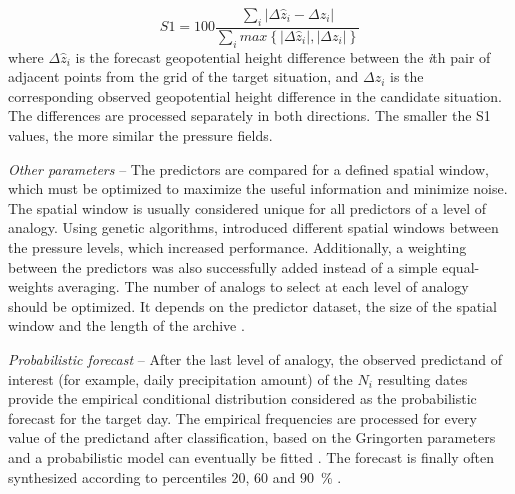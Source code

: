 \documentclass[gmd]{copernicus}
\begin{document}
\begin{equation}
\label{eq:S1}
S1=100 \frac {\displaystyle \sum_{i} \vert \Delta\hat{z}_{i} - \Delta z_{i} \vert}
{\displaystyle \sum_{i} max\left\lbrace \vert \Delta\hat{z}_{i} \vert , \vert \Delta z_{i} \vert \right\rbrace }
\end{equation}
where $\Delta \hat{z}_{i}$ is the forecast geopotential height difference between the \textit{i}th pair of adjacent points from the grid of the target situation, and $\Delta z_{i}$ is the corresponding observed geopotential height difference in the candidate situation. The differences are processed separately in both directions. The smaller the S1 values, the more similar the pressure fields.

\textit{Other parameters} -- The predictors are compared for a defined spatial window, which must be optimized to maximize the useful information and minimize noise. The spatial window is usually considered unique for all predictors of a level of analogy. Using genetic algorithms, \citet{Horton2018a} introduced different spatial windows between the pressure levels, which increased performance. Additionally, a weighting between the predictors was also successfully added instead of a simple equal-weights averaging. The number of analogs to select at each level of analogy should be optimized. It depends on the predictor dataset, the size of the spatial window and the length of the archive \citet{Ruosteenoja1988, Vandendool1994}.

\textit{Probabilistic forecast} -- After the last level of analogy, the observed predictand of interest (for example, daily precipitation amount) of the $N_{i}$ resulting dates provide the empirical conditional distribution considered as the probabilistic forecast for the target day. The empirical frequencies are processed for every value of the predictand after classification, based on the Gringorten parameters \cite[for a Gumbel or exponential law; see][]{Gringorten1963} and a probabilistic model can eventually be fitted \citep[e.g. Gamma function,][]{Obled2002}. The forecast is finally often synthesized according to percentiles 20, 60 and 90~\% \citep{Guilbaud1997, Guilbaud1998}.
\end{document}
